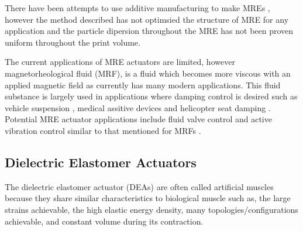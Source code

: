 There have been attempts to use additive manufacturing to make MREs \citep{Krueger2014,Ge2020}, however the method described has not optimsied the structure of MRE for any application and the particle dipersion throughout the MRE has not been proven uniform throughout the print volume.

The current applications of MRE actuators are limited, however magnetorheological fluid (MRF), is a fluid which becomes more viscous with an applied magnetic field as currently has many modern applications. This fluid substance is largely used in applications where damping control is desired such as vehicle suspension \citep{UnuhH2019}, medical assitive devices \citep{Chen2017} and helicopter seat damping \citep{Hiemenz2007}. Potential MRE actuator applications include fluid valve control \citep{Bose2012} and active vibration control similar to that mentioned for MRFs \citep{UnuhH2019}.

\subsection{Dielectric Elastomer Actuators}
The dielectric elastomer actuator (DEAs) are often called artificial muscles because they share similar characteristics to biological muscle such as, the large strains achievable, the high elastic energy density, many topologies/configurations achievable, and constant volume during its contraction.

